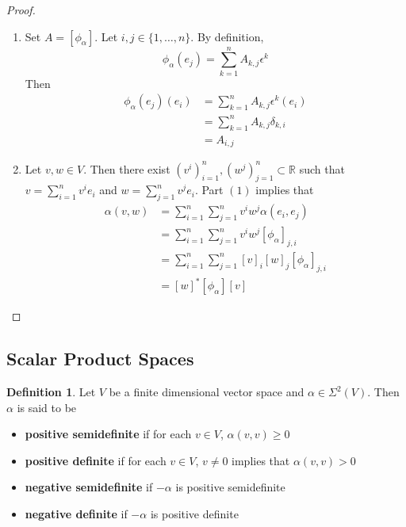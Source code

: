 \documentclass{book}
\theoremstyle{definition}
\newtheorem{defn}[definition]{Definition}
\newcommand{\al}{\alpha}
\newcommand{\del}{\delta}
\newcommand{\ep}{\epsilon}
\newcommand{\Sig}{\Sigma}
\newcommand{\R}{\mathbb{R}}
\DeclareMathOperator*{\0}{\mbf{0}}
\DeclareMathOperator*{\1}{\mbf{1}}
\newcommand{\tbf}[1]{\textbf{#1}}
\begin{document}
	\begin{proof}
		\begin{enumerate}
			\item Set $A = [\phi_{\al}]$. Let $i, j \in \{1, \ldots, n\}$. By definition,
			$$\phi_{\al}(e_j) = \sum\limits_{k =1}^n A_{k,j} \ep^{k}$$ 
			Then 
			\begin{align*}
				\phi_{\al}(e_j)(e_i)
				& = \sum\limits_{k =1}^n A_{k,j} \ep^{k}(e_i) \\
				& =  \sum\limits_{k =1}^n A_{k,j} \del_{k,i} \\
				& =  A_{i,j} 
			\end{align*}
			\item Let $v, w \in V$. Then there exist $(v^i)_{i=1}^n, (w^j)_{j=1}^n \subset \R$ such that $v = \sum\limits_{i=1}^n v^i e_i$ and $w = \sum\limits_{j=1}^n v^j e_i$. Part $(1)$ implies that
			\begin{align*}
				\al(v, w)
				& = \sum_{i=1}^n \sum_{j=1}^n v^i w^j \al(e_i, e_j) \\
				& = \sum_{i=1}^n \sum_{j=1}^n v^i w^j [\phi_{\al}]_{j, i} \\
				& = \sum_{i=1}^n \sum_{j=1}^n [v]_i [w]_j [\phi_{\al}]_{j, i} \\
				& = [w]^* [\phi_{\al}] [v]
			\end{align*}
		\end{enumerate}
	\end{proof}


















	\subsection{Scalar Product Spaces}
	
	\begin{defn}
		Let $V$ be a finite dimensional vector space and $\al \in \Sig^2(V)$. Then $\al$ is said to be 
		\begin{itemize}
			\item \tbf{positive semidefinite} if for each $v \in V$, $\al(v, v) \geq 0$
			\item \tbf{positive definite} if for each $v \in V$, $v \neq 0$ implies that $\al(v, v) > 0$
			\item \tbf{negative semidefinite} if $-\al$ is positive semidefinite
			\item \tbf{negative definite} if $-\al$ is positive definite
		\end{itemize}
	\end{defn}
\end{document}
